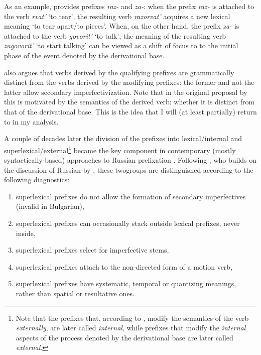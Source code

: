 As an example, \citet{Isachenko:60} provides prefixes \textit{raz-} and \textit{za-}: when the prefix \textit{raz-} is attached to the verb \textit{rvat'}\textsuperscript{\IPF} `to tear', the resulting verb \textit{razorvat'}\textsuperscript{\PF} acquires a new lexical meaning `to tear apart/to pieces'. When, on the other hand, the prefix \textit{za-} is attached to the verb \textit{govorit'}\textsuperscript{\IPF} `to talk', the meaning of the resulting verb \textit{zagovorit'}\textsuperscript{\PF} `to start talking' can be viewed as a shift of focus to to the initial phase of the event denoted by the derivational base.

\citet{Isachenko:60} also argues that verbs derived by the qualifying prefixes are grammatically distinct from the verbs derived by the modifying prefixes: the former and not the latter allow secondary imperfectivization. Note that in the original proposal by \citet{Isachenko:60} this is motivated by the semantics of the derived verb: whether it is distinct from that of the derivational base. This is the idea that I will (at least partially) return to in my analysis.

A couple of decades later the division of the prefixes into lexical\slash internal and superlexical\slash external\footnote{Note that the prefixes that, according to \citet{Isachenko:60}, modify the semantics of the verb \textit{externally}, are later called \textit{internal}, while prefixes that modify the \textit{internal} aspects of the process denoted by the derivational base are later called \textit{external}.} became the key component in contemporary (mostly syn\-tac\-tically-based) approaches to Russian prefixation \citep{Schoorlemmer:95, Babko-Malaya:99, Borik:02, Gehrke:04, Ramchand:04, Romanova:04, Romanova:06, Svenonius:04a, Svenonius:04b, DiSciullo:05}. Following \citet[229]{Svenonius:04b}, who builds on the discussion of Russian by \citet{Schoorlemmer:95}, these two\linebreak groups are distinguished according to the following diagnostics:

\begin{enumerate}
\item superlexical prefixes do not allow the formation of secondary imperfectives (invalid in Bulgarian), 
\item superlexical prefixes can occasionally stack outside lexical prefixes, never inside, 
\item superlexical prefixes select for imperfective stems, 
\item superlexical prefixes attach to the non-directed form of a motion verb,
\item superlexical prefixes have systematic, temporal or quantizing meanings, rather than spatial or resultative ones.
\end{enumerate}

